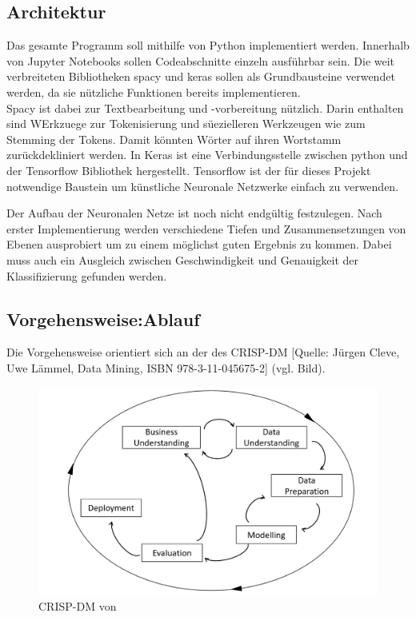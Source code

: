 \documentclass[paper=a4,12pt,listof=totoc]{scrartcl}%
\begin{document}
	\subsection{Architektur} %
	Das gesamte Programm soll mithilfe von Python implementiert werden. Innerhalb von Jupyter Notebooks sollen Codeabschnitte einzeln ausführbar sein. Die weit verbreiteten Bibliotheken spacy und keras sollen als Grundbausteine verwendet werden, da sie nützliche Funktionen bereits implementieren.\\
	Spacy ist dabei zur Textbearbeitung und -vorbereitung nützlich. Darin enthalten sind WErkzuege zur Tokenisierung und süezielleren Werkzeugen wie zum Stemming der Tokens. Damit könnten Wörter auf ihren Wortstamm zurückdekliniert werden.
	In Keras ist eine Verbindungsstelle zwischen python und der Tensorflow Bibliothek hergestellt. Tensorflow ist der für dieses Projekt notwendige Baustein um künstliche Neuronale Netzwerke einfach zu verwenden.
	
	Der Aufbau der Neuronalen Netze ist noch nicht endgültig festzulegen. Nach erster Implementierung werden verschiedene Tiefen und Zusammensetzungen von Ebenen ausprobiert um zu einem möglichst guten Ergebnis zu kommen. Dabei muss auch ein Ausgleich zwischen Geschwindigkeit und Genauigkeit der Klassifizierung gefunden werden.
	
	\subsection{Vorgehensweise:Ablauf} %
	Die Vorgehensweise orientiert sich an der des CRISP-DM [Quelle: Jürgen Cleve, Uwe Lämmel, Data Mining, ISBN 978-3-11-045675-2] (vgl. Bild). 
	
	\begin{figure}
		\caption{CRISP-DM von \cite{Cleve.2016}}
		\centering
		\includegraphics[width=\linewidth]{CRISP-DMGregor.png}
	\end{figure}
	
\end{document}
